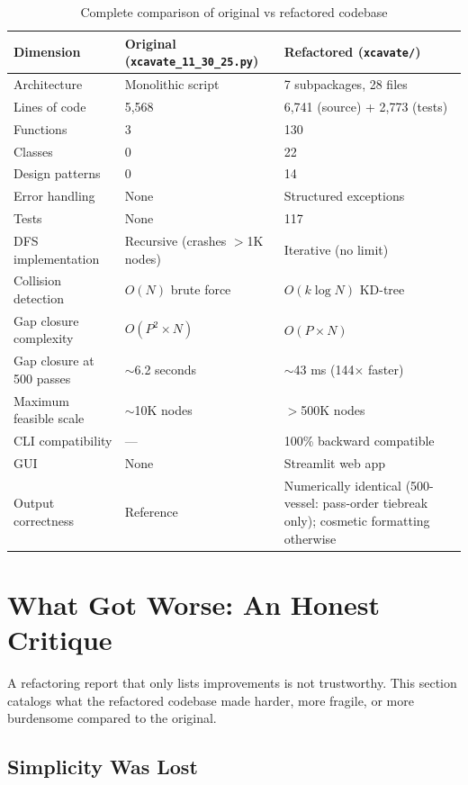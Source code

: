\documentclass[11pt,a4paper]{article}
\begin{document}
\begin{table}[H]
\centering
\caption{Complete comparison of original vs refactored codebase}
\begin{tabularx}{\textwidth}{lXX}
\toprule
\textbf{Dimension} & \textbf{Original (\texttt{xcavate\_11\_30\_25.py})} & \textbf{Refactored (\texttt{xcavate/})} \\
\midrule
Architecture & Monolithic script & 7 subpackages, 28 files \\
Lines of code & 5,568 & 6,741 (source) + 2,773 (tests) \\
Functions & 3 & 130 \\
Classes & 0 & 22 \\
Design patterns & 0 & 14 \\
Error handling & None & Structured exceptions \\
Tests & None & 117 \\
DFS implementation & Recursive (crashes $>$1K nodes) & Iterative (no limit) \\
Collision detection & $O(N)$ brute force & $O(k \log N)$ KD-tree \\
Gap closure complexity & $O(P^2 \times N)$ & $O(P \times N)$ \\
Gap closure at 500 passes & $\sim$6.2 seconds & $\sim$43 ms (144$\times$ faster) \\
Maximum feasible scale & $\sim$10K nodes & $>$500K nodes \\
CLI compatibility & --- & 100\% backward compatible \\
GUI & None & Streamlit web app \\
Output correctness & Reference & Numerically identical (500-vessel: pass-order tiebreak only); cosmetic formatting otherwise \\
\bottomrule
\end{tabularx}
\end{table}


\section{What Got Worse: An Honest Critique}

A refactoring report that only lists improvements is not trustworthy. This section catalogs what the refactored codebase made harder, more fragile, or more burdensome compared to the original.

\subsection{Simplicity Was Lost}
\end{document}
